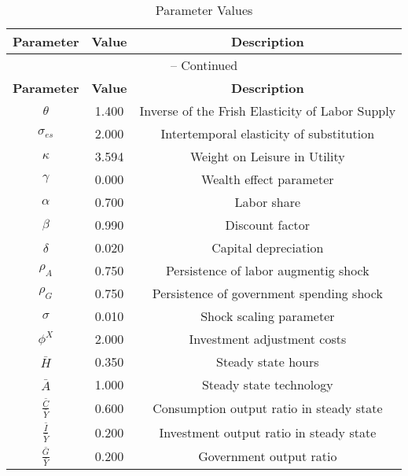 \begin{center}
\begin{longtable}{ccc}
\caption{Parameter Values}\\%
\toprule%
\multicolumn{1}{c}{\textbf{Parameter}} &
\multicolumn{1}{c}{\textbf{Value}} &
 \multicolumn{1}{c}{\textbf{Description}}\\%
\midrule%
\endfirsthead
\multicolumn{3}{c}{{\tablename} \thetable{} -- Continued}\\%
\midrule%
\multicolumn{1}{c}{\textbf{Parameter}} &
\multicolumn{1}{c}{\textbf{Value}} &
  \multicolumn{1}{c}{\textbf{Description}}\\%
\midrule%
\endhead
${\theta}$ 	 & 	 1.400 	 & 	 Inverse of the Frish Elasticity of Labor Supply\\
${\sigma_{es}}$ 	 & 	 2.000 	 & 	 Intertemporal elasticity of substitution\\
${\kappa}$ 	 & 	 3.594 	 & 	 Weight on Leisure in Utility\\
${\gamma}$ 	 & 	 0.000 	 & 	 Wealth effect parameter\\
${\alpha}$ 	 & 	 0.700 	 & 	 Labor share\\
${\beta}$ 	 & 	 0.990 	 & 	 Discount factor\\
${\delta}$ 	 & 	 0.020 	 & 	 Capital depreciation\\
${\rho_{A}}$ 	 & 	 0.750 	 & 	 Persistence of labor augmentig shock\\
${\rho_{G}}$ 	 & 	 0.750 	 & 	 Persistence of government spending shock\\
${\sigma}$ 	 & 	 0.010 	 & 	 Shock scaling parameter\\
${\phi^X}$ 	 & 	 2.000 	 & 	 Investment adjustment costs\\
$\bar{H}$ 	 & 	 0.350 	 & 	 Steady state hours\\
$\bar{A}$ 	 & 	 1.000 	 & 	 Steady state technology\\
$\frac{\bar{C}}{\bar{Y}}$ 	 & 	 0.600 	 & 	 Consumption output ratio in steady state\\
$\frac{\bar{I}}{\bar{Y}}$ 	 & 	 0.200 	 & 	 Investment output ratio in steady state\\
$\frac{\bar{G}}{\bar{Y}}$ 	 & 	 0.200 	 & 	 Government output ratio\\
\bottomrule%
\end{longtable}
\end{center}
